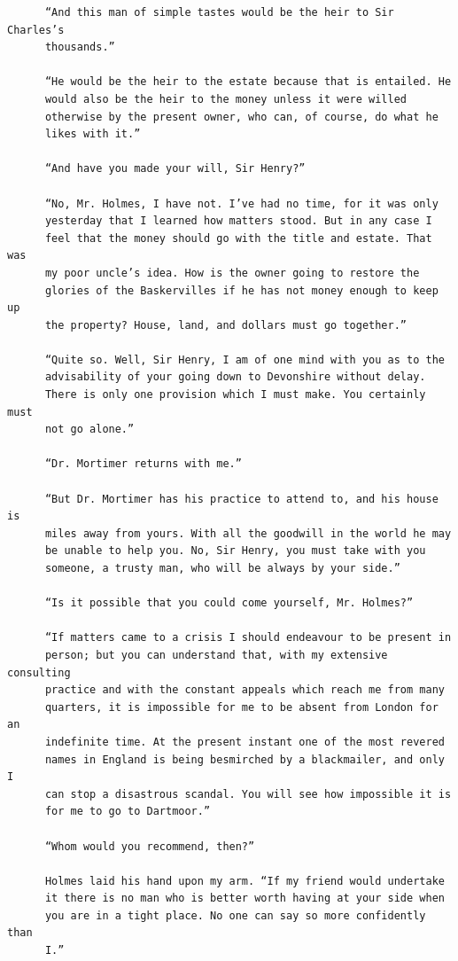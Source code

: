 \documentclass{article}
\begin{document}
\begin{verbatim}
      “And this man of simple tastes would be the heir to Sir Charles’s
      thousands.”

      “He would be the heir to the estate because that is entailed. He
      would also be the heir to the money unless it were willed
      otherwise by the present owner, who can, of course, do what he
      likes with it.”

      “And have you made your will, Sir Henry?”

      “No, Mr. Holmes, I have not. I’ve had no time, for it was only
      yesterday that I learned how matters stood. But in any case I
      feel that the money should go with the title and estate. That was
      my poor uncle’s idea. How is the owner going to restore the
      glories of the Baskervilles if he has not money enough to keep up
      the property? House, land, and dollars must go together.”

      “Quite so. Well, Sir Henry, I am of one mind with you as to the
      advisability of your going down to Devonshire without delay.
      There is only one provision which I must make. You certainly must
      not go alone.”

      “Dr. Mortimer returns with me.”

      “But Dr. Mortimer has his practice to attend to, and his house is
      miles away from yours. With all the goodwill in the world he may
      be unable to help you. No, Sir Henry, you must take with you
      someone, a trusty man, who will be always by your side.”

      “Is it possible that you could come yourself, Mr. Holmes?”

      “If matters came to a crisis I should endeavour to be present in
      person; but you can understand that, with my extensive consulting
      practice and with the constant appeals which reach me from many
      quarters, it is impossible for me to be absent from London for an
      indefinite time. At the present instant one of the most revered
      names in England is being besmirched by a blackmailer, and only I
      can stop a disastrous scandal. You will see how impossible it is
      for me to go to Dartmoor.”

      “Whom would you recommend, then?”

      Holmes laid his hand upon my arm. “If my friend would undertake
      it there is no man who is better worth having at your side when
      you are in a tight place. No one can say so more confidently than
      I.”


\end{verbatim}
\end{document}
